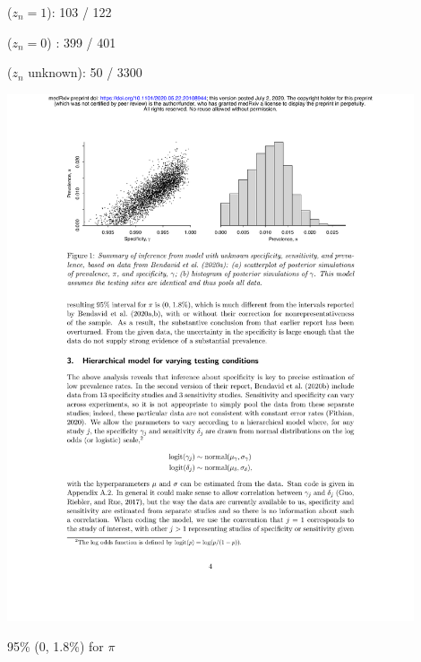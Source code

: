 \documentclass[9pt]{report}
\begin{document}
\begin{subitemize}
\item {} ($z_n = 1$): 103 / 122
\item {} ($z_n = 0$) : 399 / 401
\item {} ($z_n$ unknown): 50 / 3300
\end{subitemize}
\vspace*{-6pt}
\begin{center}
\includegraphics[width=0.9\textwidth]{img/simple-inf.pdf}
\end{center}
\vspace*{-8pt}
\begin{subitemize}
\item 95\%  (0, 1.8\%) for $\pi$ 
\end{subitemize}
\end{document}
